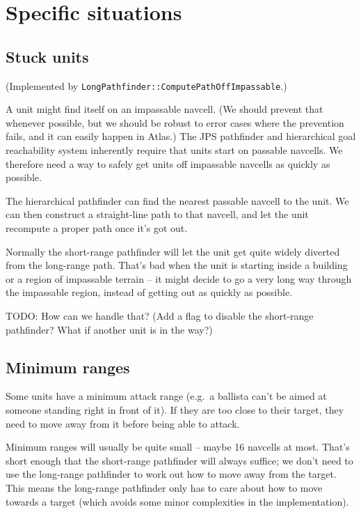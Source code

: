 \documentclass[a4paper,10pt]{article}
\begin{document}
\section{Specific situations}

\subsection{Stuck units}

(Implemented by \texttt{LongPathfinder::ComputePathOffImpassable}.)

A unit might find itself on an impassable navcell.
(We should prevent that whenever possible,
but we should be robust to error cases where the prevention fails,
and it can easily happen in Atlas.)
The JPS pathfinder and hierarchical goal reachability system
inherently require that units start on passable navcells.
We therefore need a way to safely get units off impassable navcells as quickly as possible.

The hierarchical pathfinder can find the nearest passable navcell to the unit.
We can then construct a straight-line path to that navcell,
and let the unit recompute a proper path once it's got out.

Normally the short-range pathfinder will let the unit get quite widely diverted from the long-range path.
That's bad when the unit is starting inside a building or a region of impassable terrain --
it might decide to go a very long way through the impassable region,
instead of getting out as quickly as possible.

TODO: How can we handle that? (Add a flag to disable the short-range pathfinder?
What if another unit is in the way?)

\subsection{Minimum ranges}

Some units have a minimum attack range (e.g.\ a ballista can't be aimed
at someone standing right in front of it).
If they are too close to their target,
they need to move away from it before being able to attack.

Minimum ranges will usually be quite small -- maybe 16 navcells at most.
That's short enough that the short-range pathfinder will always suffice;
we don't need to use the long-range pathfinder to work out how to move
away from the target.
This means the long-range pathfinder only has to care about how to move
towards a target (which avoids some minor complexities in the implementation).
\end{document}
